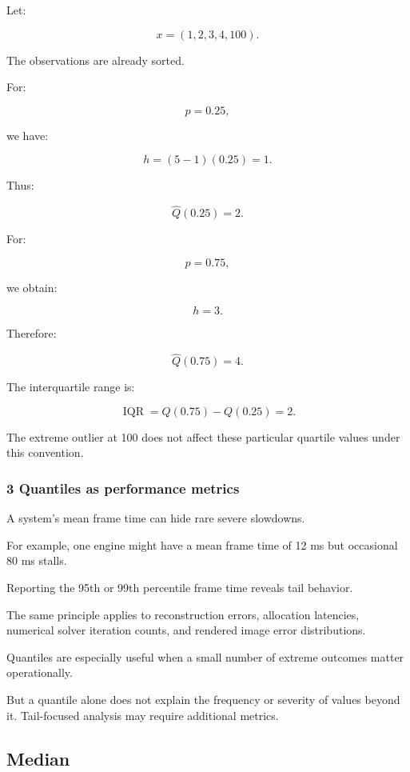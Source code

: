 \hypertarget{02-foundations-ii-ch030-numerical-example-exponential-quantile}{}

Let:

\[
 x=(1,2,3,4,100).
\]

The observations are already sorted.

For:

\[
 p=0.25,
\]

we have:

\[
 h=(5-1)(0.25)=1.
\]

Thus:

\[
 \hat Q(0.25)=2.
\]

For:

\[
 p=0.75,
\]

we obtain:

\[
 h=3.
\]

Therefore:

\[
 \hat Q(0.75)=4.
\]

The interquartile range is:

\[
 \boxed{ \operatorname{IQR}=Q(0.75)-Q(0.25)=2 }.
\]

The extreme outlier at 100 does not affect these particular quartile values under this convention.

\subsubsection{3 Quantiles as performance metrics}\label{02-foundations-ii-ch030-quantiles-as-performance-metrics}

\hypertarget{02-foundations-ii-ch030-quantiles-as-performance-metrics}{}

A system's mean frame time can hide rare severe slowdowns.

For example, one engine might have a mean frame time of 12 ms but occasional 80 ms stalls.

Reporting the 95th or 99th percentile frame time reveals tail behavior.

The same principle applies to reconstruction errors, allocation latencies, numerical solver iteration counts, and rendered image error distributions.

Quantiles are especially useful when a small number of extreme outcomes matter operationally.

But a quantile alone does not explain the frequency or severity of values beyond it. Tail-focused analysis may require additional metrics.

\subsection{Median}\label{02-foundations-ii-ch030-median}

